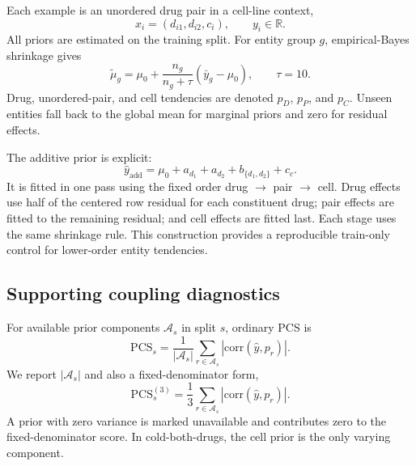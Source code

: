\documentclass[conference]{IEEEtran}
\begin{document}
Each example is an unordered drug pair in a cell-line context,
\begin{equation}
x_i=(d_{i1},d_{i2},c_i), \qquad y_i\in\mathbb{R}.
\end{equation}
All priors are estimated on the training split. For entity group $g$, empirical-Bayes shrinkage gives
\begin{equation}
\widetilde{\mu}_g=\mu_0+\frac{n_g}{n_g+\tau}(\bar y_g-\mu_0),\qquad \tau=10.
\end{equation}
Drug, unordered-pair, and cell tendencies are denoted $p_D$, $p_P$, and $p_C$. Unseen entities fall back to the global mean for marginal priors and zero for residual effects.

The additive prior is explicit:
\begin{equation}
\hat y_{\mathrm{add}}=\mu_0+a_{d_1}+a_{d_2}+b_{\{d_1,d_2\}}+c_c.
\end{equation}
It is fitted in one pass using the fixed order drug $\rightarrow$ pair $\rightarrow$ cell. Drug effects use half of the centered row residual for each constituent drug; pair effects are fitted to the remaining residual; and cell effects are fitted last. Each stage uses the same shrinkage rule. This construction provides a reproducible train-only control for lower-order entity tendencies.

\subsection{Supporting coupling diagnostics}

For available prior components $\mathcal A_s$ in split $s$, ordinary PCS is
\begin{equation}
\mathrm{PCS}_s=\frac{1}{|\mathcal A_s|}\sum_{r\in\mathcal A_s}|\mathrm{corr}(\hat y,p_r)|.
\end{equation}
We report $|\mathcal A_s|$ and also a fixed-denominator form,
\begin{equation}
\mathrm{PCS}^{(3)}_s=\frac{1}{3}\sum_{r\in\mathcal A_s}
\left|\mathrm{corr}(\hat y,p_r)\right|.
\end{equation}
A prior with zero variance is marked unavailable and contributes zero to the fixed-denominator score. In cold-both-drugs, the cell prior is the only varying component.
\end{document}
